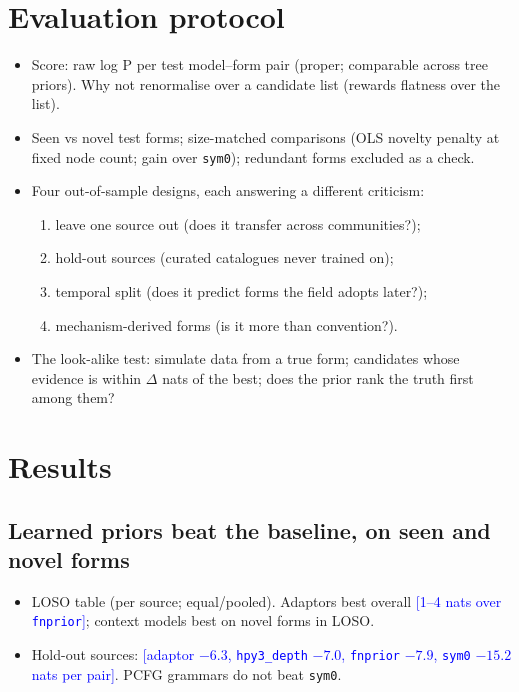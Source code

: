 \documentclass[11pt]{article}
\newcommand{\cur}[1]{\textcolor{blue}{[#1]}}
\begin{document}
\section{Evaluation protocol}
\begin{itemize}
  \item Score: raw log P per test model--form pair (proper; comparable across tree priors). Why not
  renormalise over a candidate list (rewards flatness over the list).
  \item Seen vs novel test forms; size-matched comparisons (OLS novelty penalty at fixed node count;
  gain over \texttt{sym0}); redundant forms excluded as a check.
  \item Four out-of-sample designs, each answering a different criticism:
  \begin{enumerate}
    \item leave one source out (does it transfer across communities?);
    \item hold-out sources (curated catalogues never trained on);
    \item temporal split (does it predict forms the field adopts later?);
    \item mechanism-derived forms (is it more than convention?).
  \end{enumerate}
  \item The look-alike test: simulate data from a true form; candidates whose evidence is within
  $\Delta$ nats of the best; does the prior rank the truth first among them?
\end{itemize}

\section{Results}

\subsection{Learned priors beat the baseline, on seen and novel forms}
\begin{itemize}
  \item LOSO table (per source; equal/pooled). Adaptors best overall \cur{1--4 nats over
  \texttt{fnprior}}; context models best on novel forms in LOSO.
  \item Hold-out sources: \cur{adaptor $-6.3$, \texttt{hpy3\_depth} $-7.0$, \texttt{fnprior} $-7.9$,
  \texttt{sym0} $-15.2$ nats per pair}. PCFG grammars do not beat \texttt{sym0}.
\end{itemize}
\end{document}
